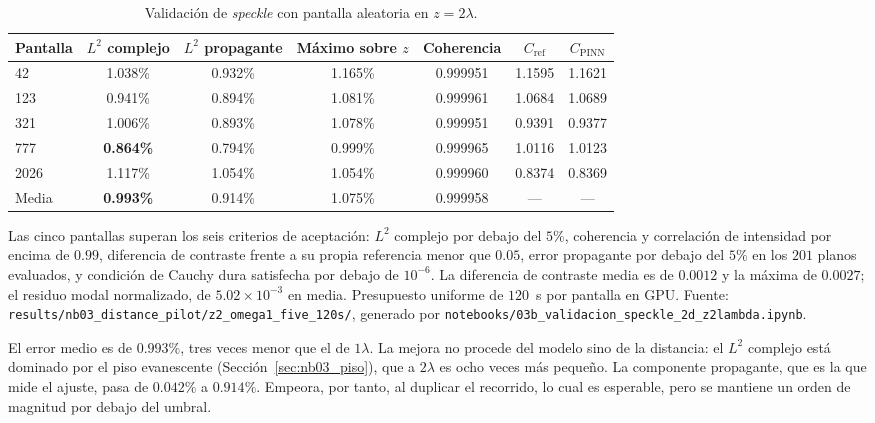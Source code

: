 \begin{table}[htbp]
\centering
\begin{threeparttable}
\caption{Validación de \textit{speckle} con pantalla aleatoria en $z=2\lambda$.}
\label{tab:nb03_z2}
\begin{tabular}{lcccccc}
\toprule
Pantalla & $L^2$ complejo & $L^2$ propagante & Máximo sobre $z$ & Coherencia & $C_\text{ref}$ & $C_\text{PINN}$ \\
\midrule
42   & 1.038\% & 0.932\% & 1.165\% & 0.999951 & 1.1595 & 1.1621 \\
123  & 0.941\% & 0.894\% & 1.081\% & 0.999961 & 1.0684 & 1.0689 \\
321  & 1.006\% & 0.893\% & 1.078\% & 0.999951 & 0.9391 & 0.9377 \\
777  & \textbf{0.864\%} & 0.794\% & 0.999\% & 0.999965 & 1.0116 & 1.0123 \\
2026 & 1.117\% & 1.054\% & 1.054\% & 0.999960 & 0.8374 & 0.8369 \\
\midrule
Media & \textbf{0.993\%} & 0.914\% & 1.075\% & 0.999958 & --- & --- \\
\bottomrule
\end{tabular}
\begin{tablenotes}\small
    \item Las cinco pantallas superan los seis criterios de aceptación: $L^2$
    complejo por debajo del $5\%$, coherencia y correlación de intensidad por
    encima de $0.99$, diferencia de contraste frente a su propia referencia
    menor que $0.05$, error propagante por debajo del $5\%$ en los $201$ planos
    evaluados, y condición de Cauchy dura satisfecha por debajo de $10^{-6}$.
    La diferencia de contraste media es de $0.0012$ y la máxima de $0.0027$; el
    residuo modal normalizado, de $5.02\times10^{-3}$ en media. Presupuesto
    uniforme de $120$~s por pantalla en GPU. Fuente:
    \texttt{results/nb03\_distance\_pilot/z2\_omega1\_five\_120s/}, generado por
    \texttt{notebooks/03b\_validacion\_speckle\_2d\_z2lambda.ipynb}.
\end{tablenotes}
\end{threeparttable}
\end{table}

El error medio es de $0.993\%$, tres veces menor que el de $1\lambda$. La mejora
no procede del modelo sino de la distancia: el $L^2$ complejo está dominado por
el piso evanescente (Sección~\ref{sec:nb03_piso}), que a $2\lambda$ es ocho
veces más pequeño. La componente propagante, que es la que mide el ajuste, pasa de $0.042\%$ a $0.914\%$. Empeora, por tanto, al duplicar el recorrido, lo cual es esperable, pero se mantiene un orden de magnitud por debajo del umbral.

